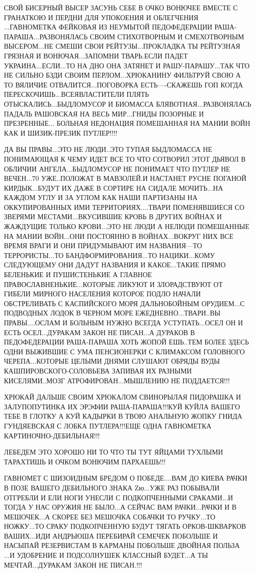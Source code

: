 СВОЙ БИСЕРНЫЙ ВЫСЕР ЗАСУНЬ СЕБЕ В ОЧКО ВОНЮЧЕЕ ВМЕСТЕ С ГРАНАТКОЮ И ПЕРДНИ ДЛЯ
УПОКОЕНИЯ И ОБЛЕГЧЕНИЯ ...ГАВНОМЕТКА ФЕЙКОВАЯ ИЗ НЕУМЫТОЙ ПЕДОФЕДЕРАЦИИ
РАША-ПАРАША...РАЗВОНЯЛАСЬ СВОИМ СТИХОТВОРНЫМ И СМЕХОТВОРНЫМ ВЫСЕРОМ...НЕ СМЕШИ
СВОИ РЕЙТУЗЫ...ПРОКЛАДКА ТЫ РЕЙТУЗНАЯ ГРЯЗНАЯ И ВОНЮЧАЯ...ЗАПОМНИ ТВАРЬ.ЕСЛИ
ПАДЕТ УКРАИНА...ЕСЛИ...ТО НА ДНО ОНА ЗАТЯНЕТ И РАШУ-ПАРАШУ...ТАК ЧТО НЕ СИЛЬНО
БЗДИ СВОИМ ПЕРЛОМ...ХРЮКАНИНУ ФИЛЬТРУЙ СВОЮ А ТО ВЯЛИЧИЕ ОТВАЛИТСЯ...ПОГОВОРКА
ЕСТЬ----СКАЖЕШЬ ГОП КОГДА ПЕРЕСКОЧИШЬ...ВСЕЯВЛАСТИТЕЛИ ПЛЯТЬ
ОТЫСКАЛИСЬ...БЫДЛОМУСОР И БИОМАССА БЛЯВОТНАЯ...РАЗВОНЯЛАСЬ ПАДАЛЬ РАШОВСКАЯ НА
ВЕСЬ МИР...ГНИДЫ ПОЗОРНЫЕ И ПРЕЗРЕННЫЕ... БОЛЬНАЯ НЕДОНАЦИЯ ПОМЕШАННАЯ НА МАНИИ
ВОЙН КАК И ШИЗИК-ПРЕЗИК ПУТЛЕР!!!!                              


ДА ВЫ ПРАВЫ...ЭТО НЕ ЛЮДИ..ЭТО ТУПАЯ БЫДЛОМАССА НЕ ПОНИМАЮЩАЯ К ЧЕМУ ИДЕТ ВСЕ
ТО ЧТО СОТВОРИЛ ЭТОТ ДЬЯВОЛ В ОБЛИЧИИ АНГЕЛА...БЫДЛОМУСОР НЕ ПОНИМАЕТ ЧТО
ПУТЛЕР НЕ ВЕЧЕН...70 УЖЕ..ПОЛОЖАТ В МАВЗОЛЕЙ.И НАСТАНЕТ РУСНЕ ПОГАНОЙ
КИРДЫК...БУДУТ ИХ ДАЖЕ В СОРТИРЕ НА СИДАЛЕ МОЧИТЬ...НА КАЖДОМ УГЛУ И ЗА УГЛОМ
КАК НАШИ ПАРТИЗАНЫ НА ОККУПИРОВАННЫХ ИМИ ТЕРРИТОРИЯХ....ТВАРИ ПОМЕНЯВШИЕСЯ СО
ЗВЕРЯМИ МЕСТАМИ...ВКУСИВШИЕ КРОВЬ В ДРУГИХ ВОЙНАХ И ЖАЖДУЩИЕ ТОЛЬКО КРОВИ...ЭТО
НЕ ЛЮДИ А НЕЛЮДИ ПОМЕШАННЫЕ НА МАНИИ ВОЙН...ОНИ ПОСТОЯННО В ВОЙНАХ...ВОКРУГ НИХ
ВСЕ ВРЕМЯ ВРАГИ И ОНИ ПРИДУМЫВАЮТ ИМ НАЗВАНИЯ---ТО ТЕРРОРИСТЫ...ТО
БАНДФОРМИРОВАНИЯ...ТО НАЦИКИ...КОМУ СЛЕДУЮЩЕМУ ОНИ ДАДУТ НАЗВАНИЯ И
КАКОЕ...ТАКИЕ ПРЯМО БЕЛЕНЬКИЕ И ПУШИСТЕНЬКИЕ А ГЛАВНОЕ
ПРАВОСЛАВНЕНЬКИЕ...КОТОРЫЕ ЛИКУЮТ И ЗЛОРАДСТВУЮТ ОТ ГИБЕЛИ МИРНОГО НАСЕЛЕНИЯ
КОТОРОЕ ПОДЛО НАЧАЛИ ОБСТРЕЛИВАТЬ С КАСПИЙСКОГО МОРЯ ДАЛЬНОБОЙНЫМ ОРУДИЕМ...С
ПОДВОДНЫХ ЛОДОК В ЧЕРНОМ МОРЕ ЕЖЕДНЕВНО...ТВАРИ..ВЫ ПРАВЫ....ОСЛАМ И БОЛЬНЫМ
НУЖНО ВСЕГДА УСТУПАТЬ...ОСЕЛ ОН И ЕСТЬ ОСЕЛ...ДУРАКАМ ЗАКОН НЕ ПИСАН...А
ДУРАКОВ В ПЕДОФЕДЕРАЦИИ РАША-ПАРАША ХОТЬ ЖОПОЙ ЕШЬ..ТЕМ БОЛЕЕ ЗДЕСЬ ОДНИ
ВЫЖИВШИЕ С УМА ПЕНСИОНЕРКИ С КЛИМАКСОМ ГОЛОВНОГО ЧЕРЕПА...КОТОРЫЕ ЦЕЛЫМИ ДНЯМИ
СЛУШАЮТ ОБРЯДЫ ВУДЫ КАШПИРОВСКОГО-СОЛОВЬЕВА ЗАПИВАЯ ИХ РАЗНЫМИ КИСЕЛЯМИ..МОЗГ
АТРОФИРОВАН...МЫШЛЕНИЮ НЕ ПОДДАЕТСЯ!!!

ХРЮКАЙ ДАЛЬШЕ СВОИМ ХРЮКАЛОМ СВИНОРЫЛАЯ ПИДОРАШКА И ЗАЛУПОПУТИНКА ИХ ЭРЭФИИ
РАША-ПАРАША!!!КУЙ КУЙЛА ВАШЕГО ТЕБЕ В ГЛОТКУ А КУЙ КАДЫРКИ В ТВОЮ АНАЛЬНУЮ
ЖОПКУ ГНИДА ГУНДЯЕВСКАЯ С ЛОБКА ПУТЛЕРА!!!ЕЩЕ ОДНА ГАВНОМЕТКА
КАРТИНОЧНО-ДЕБИЛЬНАЯ!!!                     

ЛЕБЕДЕМ ЭТО ХОРОШО НИ ТО ЧТО ТЫ ТУТ ЯЙЦАМИ ТУХЛЫМИ ТАРАХТИШЬ И ОЧКОМ ВОНЮЧИМ
ПАРХАЕШЬ!!! 

ГАВНОМЕТ С ШИЗОИДНЫМ БРЕДОМ О ПОБЕДЕ....ВАМ ДО КИЕВА РАЧКИ В ПОЗЕ ВАШЕГО
ДЕБИЛЬНОГО ЗНАКА Zю...УЖЕ РАЗ ПОБЫВАЛИ ОТГРЕБЛИ И ЕЛИ НОГИ УНЕСЛИ С
ПОДКОПЧЕННЫМИ СРАКАМИ...И ТОГДА У НАС ОРУЖИЯ НЕ БЫЛО...А СЕЙЧАС ВАМ
РАЧКИ...РАЧКИ И В МЕШОЧЕК...А СКОРЕЕ БЕЗ МЕШОЧКА СОБАЧКИ ТО РУЧКУ...ТО
НОЖКУ...ТО СРАКУ ПОДКОПЧЕННУЮ БУДУТ ТЯГАТЬ ОРКОВ-ШКВАРКОВ ВАШИХ...ИДИ АНДРЬЮША
ПЕРЕБИРАЙ СЕМЕЧЕК ПОБОЛЬШЕ И НАСЫПАЙ РЕЗЕРВИСТАМ В КАРМАНЫ ПОБОЛЬШЕ ДВОЙНАЯ
ПОЛЬЗА ...И УДОБРЕНИЕ И ПОДСОЛНУШЕК КЛАССНЫЙ БУДЕТ...А ТЫ МЕЧТАЙ...ДУРАКАМ
ЗАКОН НЕ ПИСАН.!!!   

